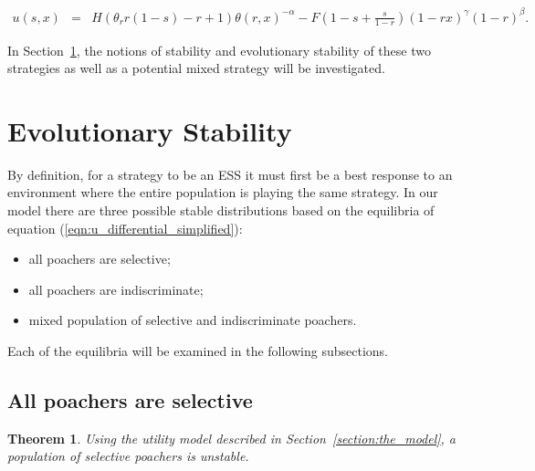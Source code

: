 \documentclass[10pt]{article}
\newtheorem{theorem}{Theorem}
\begin{document}
\begin{eqnarray}
\label{eqn:tutility2}
u(s, x) &=&
H (\theta_r r(1-s) - r + 1)\theta(r,x)^{-\alpha} - F\left(1-s + \frac{s}{1-r} \right)(1-rx)^{\gamma}(1-r)^{\beta} .
\end{eqnarray}

In Section~\ref{section:evolutionary_stability}, the notions of stability
and evolutionary stability of these two strategies as well as a potential 
mixed strategy will be investigated.

\section{Evolutionary Stability}\label{section:evolutionary_stability}

By definition, for a strategy to be an ESS it must first be a best response to an 
environment where the entire population is playing the same strategy.
In our model there are three possible stable distributions based on the
equilibria of equation (\ref{eqn:u_differential_simplified}):

\begin{itemize} 
    \item all poachers are selective;
    \item all poachers are indiscriminate;
    \item mixed population of selective and indiscriminate poachers.
\end{itemize}

Each of the equilibria will be examined in the following subsections.

\subsection{All poachers are selective}

\begin{theorem}\label{theorem:selective}
Using the utility model described in Section~\ref{section:the_model}, 
a population of selective poachers is unstable.
\end{theorem}
\end{document}
